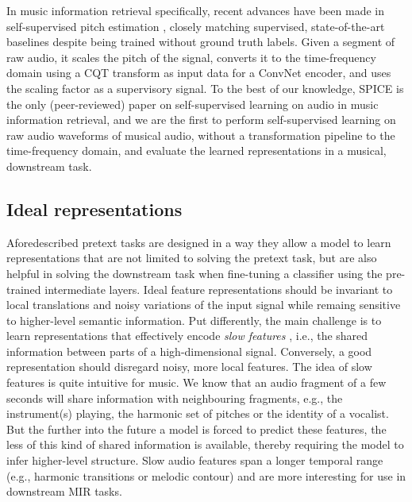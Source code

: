 In music information retrieval specifically, recent advances have been made in self-supervised pitch estimation \cite{spice}, closely matching supervised, state-of-the-art baselines despite being trained without ground truth labels. Given a segment of raw audio, it scales the pitch of the signal, converts it to the time-frequency domain using a CQT transform as input data for a ConvNet encoder, and uses the scaling factor as a supervisory signal. To the best of our knowledge, SPICE\cite{spice} is the only (peer-reviewed) paper on self-supervised learning on audio in music information retrieval, and we are the first to perform self-supervised learning on raw audio waveforms of musical audio, without a transformation pipeline to the time-frequency domain, and evaluate the learned representations in a musical, downstream task.

\subsection{Ideal representations}
Aforedescribed pretext tasks are designed in a way they allow a model to learn representations that are not limited to solving the pretext task, but are also helpful in solving the downstream task when fine-tuning a classifier using the pre-trained intermediate layers. Ideal feature representations should be invariant to local translations and noisy variations of the input signal while remaing sensitive to higher-level semantic information. Put differently, the main challenge is to learn representations that effectively encode \textit{slow features} \cite{wiskott_slow_2002}, i.e., the shared information between parts of a high-dimensional signal. Conversely, a good representation should disregard noisy, more local features. The idea of slow features is quite intuitive for music.
We know that an audio fragment of a few seconds will share information with neighbouring fragments, e.g., the instrument(s) playing, the harmonic set of pitches or the identity of a vocalist.  But the further into the future a model is forced to predict these features, the less of this kind of shared information is available, thereby requiring the model to infer higher-level structure. Slow audio features span a longer temporal range (e.g., harmonic transitions or melodic contour) and are more interesting for use in downstream MIR tasks.



